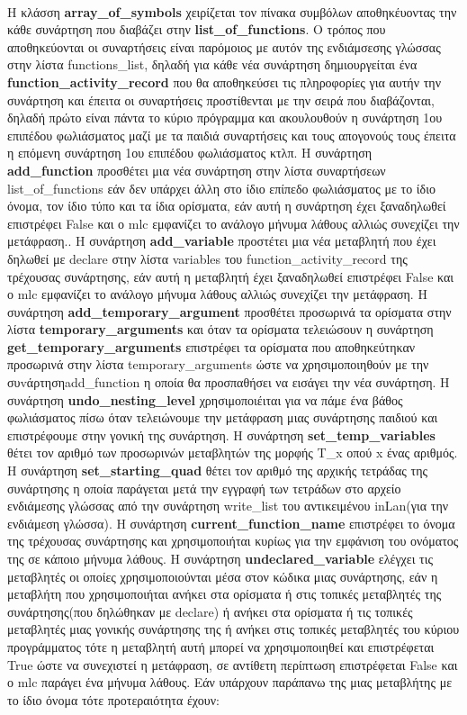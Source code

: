\documentclass[12pt,a4paper,a4paper]{report}
\begin{document}
\\Η κλάσση  \textbf{array\_of\_symbols} χειρίζεται τον πίνακα συμβόλων αποθηκέυοντας την κάθε συνάρτηση που διαβάζει στην \textbf{list\_of\_functions}. Ο τρόπος που αποθηκεύονται οι συναρτήσεις είναι παρόμοιος με αυτόν της ενδιάμσεσης γλώσσας στην λίστα functions\_list, δηλαδή για κάθε νέα συνάρτηση δημιουργείται ένα \textbf{function\_activity\_record} που θα αποθηκεύσει τις πληροφορίες για αυτήν την συνάρτηση και έπειτα οι συναρτήσεις προστίθενται με την σειρά που διαβάζονται, δηλαδή πρώτο είναι πάντα το κύριο πρόγραμμα και ακουλουθούν η συνάρτηση 1ου επιπέδου φωλιάσματος μαζί με τα παιδιά συναρτήσεις και τους απογονούς τους έπειτα η επόμενη συνάρτηση 1ου επιπέδου φωλιάσματος κτλπ. Η συνάρτηση \textbf{add\_function} προσθέτει μια νέα συνάρτηση στην λίστα συναρτήσεων  list\_of\_functions εάν δεν υπάρχει άλλη στο ίδιο επίπεδο φωλιάσματος με το ίδιο όνομα, τον ίδιο τύπο και τα ίδια ορίσματα, εάν αυτή η συνάρτηση έχει ξαναδηλωθεί επιστρέφει False και ο mlc εμφανίζει το ανάλογο μήνυμα λάθους αλλιώς συνεχίζει την μετάφραση.. Η συνάρτηση \textbf{add\_variable} προστέτει μια νέα μεταβλητή που έχει δηλωθεί με declare στην λίστα variables του function\_activity\_record της τρέχουσας συνάρτησης, εάν αυτή η μεταβλητή έχει ξαναδηλωθεί επιστρέφει False και ο mlc εμφανίζει το ανάλογο μήνυμα λάθους αλλιώς συνεχίζει την μετάφραση. Η συνάρτηση \textbf{add\_temporary\_argument} προσθέτει προσωρινά τα ορίσματα στην λίστα \textbf{temporary\_arguments} και όταν τα ορίσματα τελειώσουν η συνάρτηση \textbf{get\_temporary\_arguments} επιστρέφει τα ορίσματα που αποθηκεύτηκαν προσωρινά στην λίστα temporary\_arguments ώστε να χρησιμοποιηθούν με την συvάρτηση\newline add\_function η οποία θα προσπαθήσει να εισάγει την νέα συνάρτηση. Η συνάρτηση \textbf{undo\_nesting\_level} χρησιμοποιέιται για να πάμε ένα βάθος φωλιάσματος πίσω όταν τελειώνουμε την μετάφραση μιας συνάρτησης παιδιού και επιστρέφουμε στην γονική της συνάρτηση. Η συνάρτηση \textbf{set\_temp\_variables} θέτει τον αριθμό των προσωρινών μεταβλητών της μορφής Τ\_x οπού x ένας αριθμός. Η συνάρτηση \textbf{set\_starting\_quad} θέτει τον αριθμό της αρχικής τετράδας της συνάρτησης η οποία παράγεται μετά την εγγραφή των τετράδων στο αρχείο ενδιάμεσης γλώσσας από την συνάρτηση write\_list του αντικειμένου inLan(για την ενδιάμεση γλώσσα). Η συνάρτηση \textbf{current\_function\_name} επιστρέφει το όνομα της τρέχουσας συνάρτησης και χρησιμοποιήται κυρίως για την εμφάνιση του ονόματος της σε κάποιο μήνυμα λάθους. Η συνάρτηση \textbf{undeclared\_variable} ελέγχει τις μεταβλητές οι οποίες χρησιμοποιούνται μέσα στον κώδικα μιας συνάρτησης, εάν η μεταβλήτη που χρησιμοποιήται ανήκει στα ορίσματα ή στις τοπικές μεταβλητές της συνάρτησης(που δηλώθηκαν με declare) ή ανήκει στα ορίσματα ή τις τοπικές μεταβλητές μιας γονικής συνάρτησης της ή ανήκει στις τοπικές μεταβλητές του κύριου προγράμματος τότε η μεταβλητή αυτή μπορεί να χρησιμοποιηθεί και επιστρέφεται True ώστε να συνεχιστεί η μετάφραση, σε αντίθετη περίπτωση επιστρέφεται False και ο mlc παράγει ένα μήνυμα λάθους. Εάν υπάρχουν παράπανω της μιας μεταβλήτης με το ίδιο όνομα τότε προτεραιότητα έχουν:\\
\end{document}
